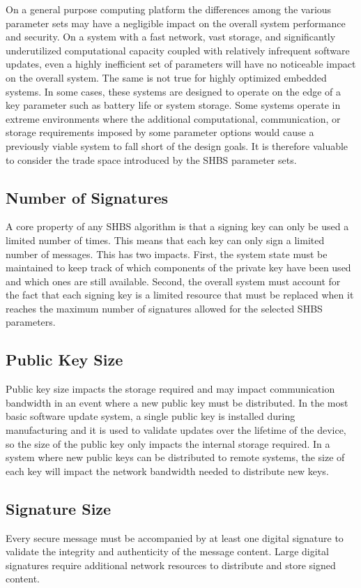 \documentclass{article}
\begin{document}
On a general purpose computing platform the differences among the various parameter sets may have a negligible impact on the overall system performance and security.  On a system with a fast network, vast storage, and significantly underutilized computational capacity coupled with relatively infrequent software updates, even a highly inefficient set of parameters will have no noticeable impact on the overall system.  The same is not true for highly optimized embedded systems.  In some cases, these systems are designed to operate on the edge of a key parameter such as battery life or system storage.  Some systems operate in extreme environments where the additional computational, communication, or storage requirements imposed by some parameter options would cause a previously viable system to fall short of the design goals.  It is therefore valuable to consider the trade space introduced by the SHBS parameter sets.  

\subsection{Number of Signatures}
A core property of any SHBS algorithm is that a signing key can only be used a limited number of times.  This means that each key can only sign a limited number of messages.  This has two impacts.  First, the system state must be maintained to keep track of which components of the private key have been used and which ones are still available.  Second, the overall system must account for the fact that each signing key is a limited resource that must be replaced when it reaches the maximum number of signatures allowed for the selected SHBS parameters.  

\subsection{Public Key Size}
Public key size impacts the storage required and may impact communication bandwidth in an event where a new public key must be distributed.  In the most basic software update system, a single public key is installed during manufacturing and it is used to validate updates over the lifetime of the device, so the size of the public key only impacts the internal storage required.  In a system where new public keys can be distributed to remote systems, the size of each key will impact the network bandwidth needed to distribute new keys.  

\subsection{Signature Size}
Every secure message must be accompanied by at least one digital signature to validate the integrity and authenticity of the message content.  Large digital signatures require additional network resources to distribute and store signed content.
\end{document}
